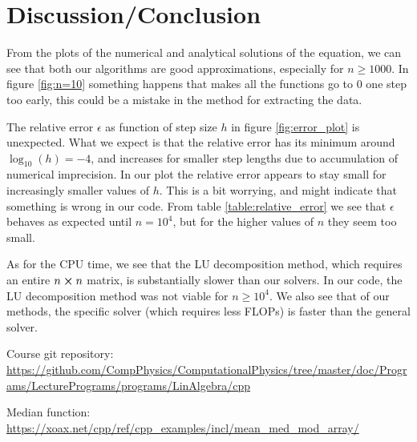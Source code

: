 \documentclass[english, nofootinbib]{revtex4-1}  %
\begin{document}
\newpage
\section{Discussion/Conclusion}
From the plots of the numerical and analytical solutions of the equation, we can see that both our algorithms are good approximations, especially for $n \geq 1000$. In figure \ref{fig:n=10} something happens that makes all the functions go to 0 one step too early, this could be a mistake in the method for extracting the data. 


The relative error $\epsilon$ as function of step size $h$ in figure \ref{fig:error_plot} is unexpected. What we expect is that the relative error has its minimum around $\log_{10}(h) = -4$, and increases for smaller step lengths due to accumulation of numerical imprecision. In our plot the relative error appears to stay small for increasingly smaller values of $h$. This is a bit worrying, and might indicate that something is wrong in our code. From table \ref{table:relative_error} we see that $\epsilon$ behaves as expected until $n = 10^4$, but for the higher values of $n$ they seem too small. 

As for the CPU time, we see that the LU decomposition method, which requires an entire $n\cross n$ matrix, is substantially slower than our solvers. In our code, the LU decomposition method was not viable for $n \geq 10^4$. We also see that of our methods, the specific solver (which requires less FLOPs) is faster than the general solver.

\begin{thebibliography}{}

 Course git repository: \url{https://github.com/CompPhysics/ComputationalPhysics/tree/master/doc/Programs/LecturePrograms/programs/LinAlgebra/cpp}

 Median function: \url{https://xoax.net/cpp/ref/cpp_examples/incl/mean_med_mod_array/}

\end{thebibliography}
\end{document}
